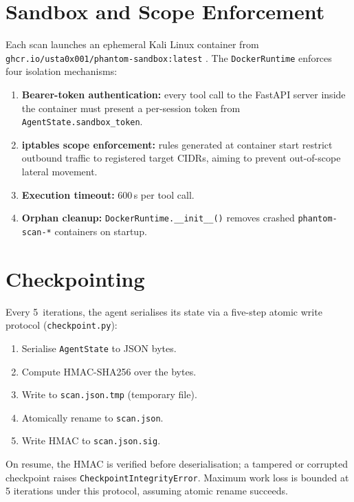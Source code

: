 \documentclass[12pt, a4paper, oneside, openany]{book}
\newcommand{\code}[1]{\texttt{#1}}
\newcommand{\file}[1]{\texttt{#1}}
\begin{document}
\section{Sandbox and Scope Enforcement}
\label{sec:sandbox}

Each scan launches an ephemeral Kali Linux container from
\code{ghcr.io/usta0x001/phantom-sandbox:latest} \citep{docker2024}.
The \code{DockerRuntime} enforces four isolation mechanisms:

\begin{enumerate}[leftmargin=*]
  \item \textbf{Bearer-token authentication:} every tool call to the
    FastAPI server inside the container must present a per-session
    token from \code{AgentState.sandbox\_token}.
  \item \textbf{iptables scope enforcement:} rules generated at
    container start restrict outbound traffic to registered target
    CIDRs, aiming to prevent out-of-scope lateral movement.
  \item \textbf{Execution timeout:} 600\,s per tool call.
  \item \textbf{Orphan cleanup:} \code{DockerRuntime.\_\_init\_\_()} removes
    crashed \code{phantom-scan-*} containers on startup.
\end{enumerate}

\section{Checkpointing}
\label{sec:checkpoint}

Every 5~iterations, the agent serialises its state via a five-step
atomic write protocol (\file{checkpoint.py}):

\begin{enumerate}[leftmargin=*]
  \item Serialise \code{AgentState} to JSON bytes.
  \item Compute HMAC-SHA256 over the bytes.
  \item Write to \code{scan.json.tmp} (temporary file).
  \item Atomically rename to \code{scan.json}.
  \item Write HMAC to \code{scan.json.sig}.
\end{enumerate}

On resume, the HMAC is verified before deserialisation; a tampered or
corrupted checkpoint raises \code{CheckpointIntegrityError}.  Maximum
work loss is bounded at 5 iterations under this protocol, assuming
atomic rename succeeds.
\end{document}
